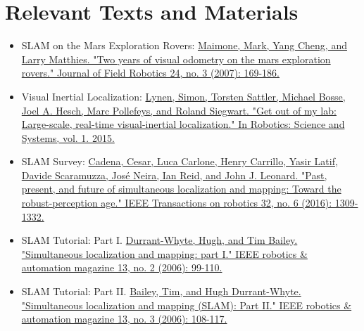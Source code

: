 
\section{Relevant Texts and Materials}

\begin{itemize}
	\item SLAM on the Mars Exploration Rovers: \href{https://onlinelibrary.wiley.com/doi/pdf/10.1002/rob.20184}{Maimone, Mark, Yang Cheng, and Larry Matthies. "Two years of visual odometry on the mars exploration rovers." Journal of Field Robotics 24, no. 3 (2007): 169-186.}
	\item Visual Inertial Localization: \href{http://www.roboticsproceedings.org/rss11/p37.pdf}{Lynen, Simon, Torsten Sattler, Michael Bosse, Joel A. Hesch, Marc Pollefeys, and Roland Siegwart. "Get out of my lab: Large-scale, real-time visual-inertial localization." In Robotics: Science and Systems, vol. 1. 2015.}
	\item SLAM Survey: \href{https://ieeexplore-ieee-org.proxy.library.upenn.edu/stamp/stamp.jsp?tp=&arnumber=7747236}{Cadena, Cesar, Luca Carlone, Henry Carrillo, Yasir Latif, Davide Scaramuzza, José Neira, Ian Reid, and John J. Leonard. "Past, present, and future of simultaneous localization and mapping: Toward the robust-perception age." IEEE Transactions on robotics 32, no. 6 (2016): 1309-1332.}
	\item SLAM Tutorial: Part I. \href{}{Durrant-Whyte, Hugh, and Tim Bailey. "Simultaneous localization and mapping: part I." IEEE robotics \& automation magazine 13, no. 2 (2006): 99-110.}
	\item SLAM Tutorial: Part II. \href{https://ieeexplore.ieee.org/stamp/stamp.jsp?arnumber=1678144}{Bailey, Tim, and Hugh Durrant-Whyte. "Simultaneous localization and mapping (SLAM): Part II." IEEE robotics \& automation magazine 13, no. 3 (2006): 108-117.}
\end{itemize}